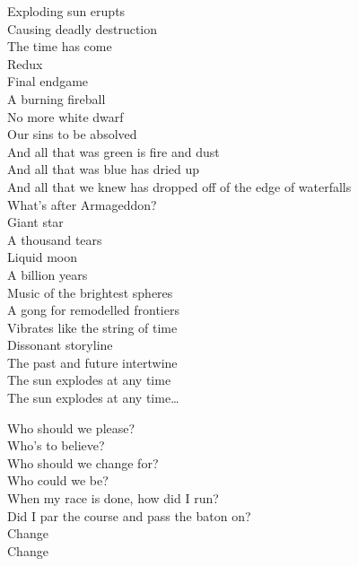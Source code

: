 Exploding sun erupts \\
Causing deadly destruction \\
The time has come \\
Redux \\
Final endgame \\
A burning fireball \\
No more white dwarf \\
Our sins to be absolved \\

And all that was green is fire and dust \\
And all that was blue has dried up \\
And all that we knew has dropped off of the edge of waterfalls \\
What's after Armageddon? \\

Giant star \\
A thousand tears \\
Liquid moon \\
A billion years \\
Music of the brightest spheres \\
A gong for remodelled frontiers \\
Vibrates like the string of time \\
Dissonant storyline \\
The past and future intertwine \\
The sun explodes at any time \\

The sun explodes at any time… \\




Who should we please? \\
Who's to believe? \\
Who should we change for? \\
Who could we be? \\
When my race is done, how did I run? \\
Did I par the course and pass the baton on? \\

Change \\
Change \\
